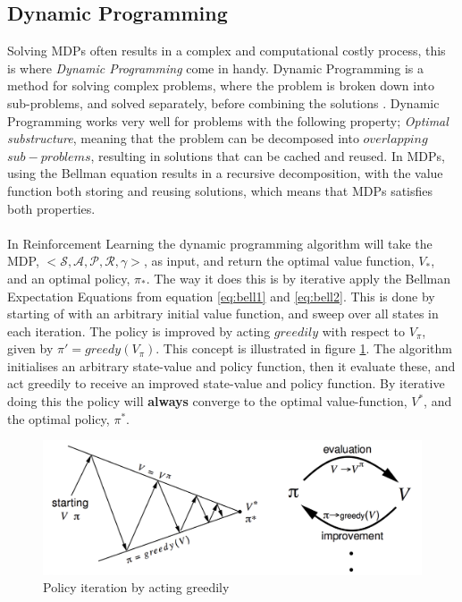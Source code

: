 \subsection{Dynamic Programming}
Solving MDPs often results in a complex and computational costly process, this is where \textit{Dynamic Programming} come in handy. Dynamic Programming is a method for solving complex problems, where the problem is broken down into sub-problems, and solved separately, before combining the solutions \cite{Silver}. Dynamic Programming works very well for problems with the following property; \textit{Optimal substructure}, meaning that the problem can be decomposed into $overlapping$ $sub-problems$, resulting in solutions that can be cached and reused. In MDPs, using the Bellman equation results in a recursive decomposition, with the value function both storing and reusing solutions, which means that MDPs satisfies both properties.\\\\
In Reinforcement Learning the dynamic programming algorithm will take the MDP, $<\mathcal{S, A, P, R, \gamma}>$, as input, and return the optimal value function, $V_{*}$, and an optimal policy, $\pi_{*}$. The way it does this is by iterative apply the Bellman Expectation Equations from equation \ref{eq:bell1} and \ref{eq:bell2}. This is done by starting of with an arbitrary initial value function, and sweep over all states in each iteration. The policy is improved by acting $greedily$ with respect to $V_{\pi}$, given by $\pi'=greedy(V_{\pi})$. This concept is illustrated in figure \ref{fig:greedily}. The algorithm initialises an arbitrary state-value and policy function, then it evaluate these, and act greedily to receive an improved state-value and policy function. By iterative doing this the policy will \textbf{always} converge to the optimal value-function, $V^{*}$, and the optimal policy, $\pi^{*}$. 
\begin{figure}[H]
    \centering
    \includegraphics[width=0.75\linewidth]{images/chap2/policy-iteration.png}
    \caption{Policy iteration by acting greedily\cite{Silver}}
    \label{fig:greedily}
\end{figure}

